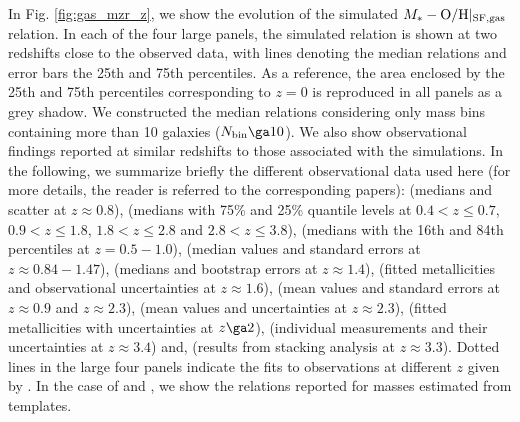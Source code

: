 \documentclass[useAMS,usenatbib]{mn2e}
\begin{document}
In Fig. \ref{fig:gas_mzr_z}, we show the evolution of the simulated $M_* - {\rm O/H}|_{\rm SF,gas}$ 
relation.  In each of the four large panels, the simulated relation is shown
at two redshifts close to the observed data, with lines denoting the median relations and error bars 
the 25th and 75th percentiles.
As a reference, the area enclosed by the 25th and 75th percentiles corresponding to $z=0$ is reproduced
in all panels as a grey shadow.
We constructed the median relations considering
only mass bins containing more than 10 galaxies ($N_{\rm bin} \ga 10$).
We also show observational findings reported at similar redshifts to those associated with the simulations.
In the following, we summarize briefly 
the different observational data used here (for more details,
the reader is referred to the corresponding papers):
\citet{delosreyes2015} (medians and scatter at $z\approx0.8$), 
\citet{hunt2016} (medians with 75\% and 25\% quantile levels at $0.4 <z \le 0.7$, $0.9 < z \le 1.8$,
$1.8 <z \le 2.8$ and $2.8 < z \le 3.8$),
\citet{ly2016} (medians with the 16th and 84th percentiles at $z=0.5-1.0$), 
\citet{stott2013} (median values and standard errors at $z\approx 0.84-1.47$),
\citet{yabe2013} (medians and bootstrap errors at $z\approx 1.4$),
\citet{zahid2014} (fitted metallicities and observational uncertainties at $z \approx 1.6$),
\citet{wuyts2016} (mean values and standard errors at $z \approx 0.9$ and $z\approx 2.3$),
\citet{sanders2015} (mean values and uncertainties at $z \approx 2.3$),
\citet{cullen2014} (fitted metallicities with uncertainties at $z \ga 2$),
\citet{troncoso2014} (individual measurements and their uncertainties at $z\approx 3.4$) and,
\citet{onodera2016} (results from stacking analysis at $z\approx 3.3$).
Dotted lines in the large four panels indicate the fits to observations at different $z$ given by \citet{maiolino2008}.
In the case of \citet{maiolino2008} and \citet{troncoso2014}, we show the relations
reported for masses estimated from \citet{bruzual2003} templates.
\end{document}
